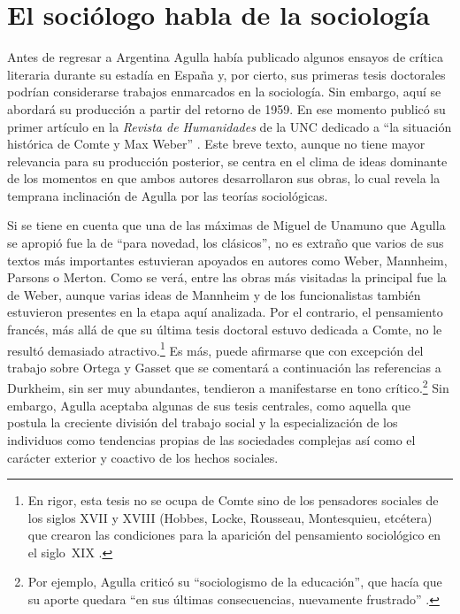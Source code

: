 \section{El sociólogo habla de la sociología}

Antes de regresar a Argentina Agulla había publicado algunos ensayos de crítica literaria durante su estadía en España y, por cierto, sus primeras tesis doctorales podrían considerarse trabajos enmarcados en la sociología. Sin embargo, aquí se abordará su producción a partir del retorno de 1959. En ese momento publicó su primer artículo en la \emph{Revista de Humanidades} de la UNC dedicado a \enquote{la situación histórica de Comte y Max Weber} \parencite{1636-AGULLA1959}. Este breve texto, aunque no tiene mayor relevancia para su producción posterior, se centra en el clima de ideas dominante de los momentos en que ambos autores desarrollaron sus obras, lo cual revela la temprana inclinación de Agulla por las teorías sociológicas.

Si se tiene en cuenta que una de las máximas de Miguel de Unamuno que Agulla se apropió fue la de \enquote{para novedad, los clásicos}, no es extraño que varios de sus textos más importantes estuvieran apoyados en autores como Weber, Mannheim, Parsons o Merton. Como se verá, entre las obras más visitadas la principal fue la de Weber, aunque varias ideas de Mannheim y de los funcionalistas también estuvieron presentes en la etapa aquí analizada. Por el contrario, el pensamiento francés, más allá de que su última tesis doctoral estuvo dedicada a Comte, no le resultó demasiado atractivo.\footnote{En rigor, esta tesis no se ocupa de Comte sino de los pensadores sociales de los siglos XVII y XVIII (Hobbes, Locke, Rousseau, Montesquieu, etcétera) que crearon las condiciones para la aparición del pensamiento sociológico en el siglo~XIX \parencite{1637-AGULLA1962}.} Es más, puede afirmarse que con excepción del trabajo sobre Ortega y Gasset que se comentará a continuación las referencias a Durkheim, sin ser muy abundantes, tendieron a manifestarse en tono crítico.\footnote{Por ejemplo, Agulla criticó su \enquote{sociologismo de la educación}, que hacía que su aporte quedara \enquote{en sus últimas consecuencias, nuevamente frustrado} \parencite[60]{1638-AGULLA1964}.} Sin embargo, Agulla aceptaba algunas de sus tesis centrales, como aquella que postula la creciente división del trabajo social y la especialización de los individuos como tendencias propias de las sociedades complejas así como el carácter exterior y coactivo de los hechos sociales.

